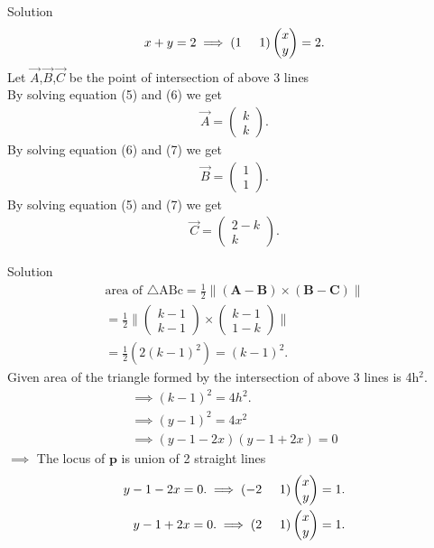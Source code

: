 \documentclass{beamer}
\numberwithin{equation}{section}
\providecommand{\brak}[1]{\ensuremath{\left(#1\right)}}
\theoremstyle{remark}
\providecommand{\norm}[1]{\lVert#1\rVert}
\newcommand{\myvec}[1]{\ensuremath{\begin{pmatrix}#1\end{pmatrix}}}
\let\vec\mathbf
\begin{document}
    \begin{frame}{Solution}
        \begin{align}
    x+y=2 \implies \brak{1\hspace{0.5cm}1}\myvec{x\\y}=2.
\end{align}
Let $\Vec{A}$,$\Vec{B}$,$\Vec{C}$ be the point of intersection of above 3 lines\\
By solving equation (5) and (6) we get
\begin{align}
    \Vec{A}=\myvec{k\\k}.
\end{align}
By solving equation (6) and (7) we get
\begin{align}
    \Vec{B}=\myvec{1\\1}.
\end{align}
By solving equation (5) and (7) we get
\begin{align}
    \Vec{C}=\myvec{2-k\\k}.
\end{align}
\end{frame}
\begin{frame}{Solution}
\begin{align}
    \text{area of }\triangle \text{ABc}=\frac{1}{2}\norm{(\vec{A}-\vec{B})\times(\vec{B}-\vec{C})}\\
    =\frac{1}{2}\norm{\myvec{k-1\\k-1}\times\myvec{k-1\\1-k}}\\
    =\frac{1}{2}(2(k-1)^2)=(k-1)^2.
\end{align}
Given area of the triangle formed by the intersection of above 3 lines is 4h$^2$.
\begin{align}
    \implies (k-1)^2= 4h^2.\\
    \implies (y-1)^2=4x^2\\
    \implies(y-1-2x)(y-1+2x)=0
    \end{align}
    $\implies$ The locus of $\vec{p}$ is union of 2 straight lines
    \begin{align}
     y-1-2x=0. \implies  \brak{-2\hspace{0.5cm}1}\myvec{x\\y}=1.\\
     y-1+2x=0. \implies  \brak{2\hspace{0.5cm}1}\myvec{x\\y}=1.
   \end{align}
    \end{frame}
\end{document}
